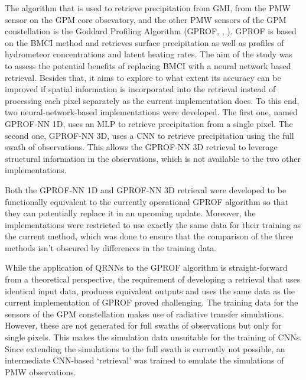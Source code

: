 The algorithm that is used to retrieve precipitation from GMI, from the PMW
sensor on the GPM core obsevatory, and the other PMW sensors of the GPM
constellation is the Goddard Profiling Algorithm (GPROF,
\citeauthor{kummerow15}, \citeyear{kummerow15}). GPROF is based on the BMCI
method and retrieves surface precipitation as well as profiles of hydrometeor
concentrations and latent heating rates. The aim of the study was to assess the
potential benefits of replacing BMCI with a neural network based retrieval.
Besides that, it aims to explore to what extent its accuracy can be improved if
spatial information is incorporated into the retrieval instead of processing
each pixel separately as the current implementation does. To this end, two
neural-network-based implementations were developed. The first one, named
GPROF-NN 1D, uses an MLP to retrieve precipitation from a single pixel. The
second one, GPROF-NN 3D, uses a CNN to retrieve precipitation using  the full
swath of observations. This allows the GPROF-NN 3D retrieval to leverage
structural information in the observations, which is not available to the two
other implementations.

Both the GPROF-NN 1D and GPROF-NN 3D retrieval were developed to be functionally
equivalent to the currently operational GPROF algorithm so that they can
potentially replace it in an upcoming update. Moreover, the implementations were
restricted to use exactly the same data for their training as the current
method, which was done to ensure that the comparison of the three methods isn't
obscured by differences in the training data.

While the application of QRNNs to the GPROF algorithm is straight-forward from a
theoretical perspective, the requirement of developing a retrieval that uses
identical input data, produces equivalent outputs and uses the same data as the
current implementation of GPROF proved challenging. The training data for the
sensors of the GPM constellation makes use of radiative transfer simulations.
However, these are not generated  for full swaths of observations but only for
single pixels. This makes the simulation data unsuitable for the training of
 CNNs. Since extending the simulations to the full swath is currently not
possible, an intermediate CNN-based `retrieval' was trained to emulate the
simulations of PMW observations.


